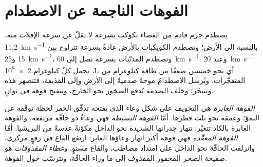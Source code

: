\section{الفوهات الناجمة عن الاصطدام}\label{sec:b3:planetary-interiors-surfaces:impacts}

يصطدم جرم قادم من الفضاء بكوكب بسرعة لا تقلّ عن سرعة الإفلات منه،
\qty{11.2}{km.s^{-1}} بالنسبة إلى الأرض؛ وتصطدم الكويكبات بالأرض عادةً
بسرعة تتراوح بين 15 و\qty{25}{km.s^{-1}}، وتصطدم المذنّبات بسرعة تصل إلى
\qty{60}{km.s^{-1}}. وعند \qty{20}{km.s^{-1}} يحمل كلّ كيلوغرام
\qty{2e8}{J}، أي نحو خمسين ضعفًا من طاقة كيلوغرام من المتفجّرات. ويُرسل
الاصطدامُ موجةً صدميةً إلى الأرض وإلى القذيفة، فتنصهر هذه وتتبخّر؛ وخلف
الصدمة تُدفع الصخور نحو الخارج،
وتنفتح فوهة في ثوانٍ.

\begin{definition}\label{def:b3:planetary-interiors-surfaces:crater-morphology}
\emph{الفوهة العابرة} هي التجويف على شكل وعاء الذي يفتحه
تدفّق الحفر لحظة توقّفه عن النموّ؛ وعمقه
نحو ثلث قطرها. أمّا \emph{الفوهة
البسيطة} فهي وعاءٌ ذو حافّة مرتفعة، والفوهة العابرة بالكاد
تتغيّر: تنهار جدرانها الشديدة نحو الداخل مكوّنةً عدسةً من
البريشيا. أمّا \emph{الفوهة المعقّدة} فهي فوهة أكبر
انهار وعاؤها العابر: ارتفع القاع في رفعٍ مركزي، وانزلقت الحافّة
نحو الداخل على امتداد مصاطب، والقاع مستوٍ. و\emph{غطاء
المقذوفات} هو صفيحة الصخر المحفور المقذوف إلى
ما وراء الحافّة، وتترسّب حول الفوهة.
\end{definition}

